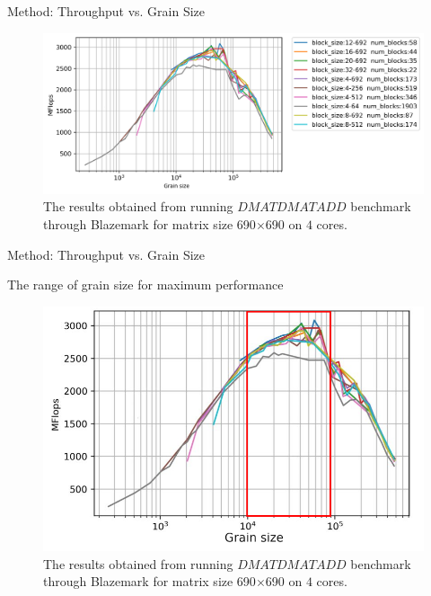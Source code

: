 \documentclass[10pt]{beamer}
\begin{document}
\begin{frame}{Method: Throughput vs. Grain Size}
	\begin{outline}
		\begin{figure}[H]
			\centering\includegraphics[width=1\linewidth]{images/fig6.png}
			\caption{The results obtained from running $DMATDMATADD$ benchmark through Blazemark for matrix size 690$\times$690 on $4$ cores.}	
			\label{fig6}
		\end{figure}
	
	\end{outline}
\end{frame}

\begin{frame}{Method: Throughput vs. Grain Size}
	\begin{outline}		
		The range of grain size for maximum performance
		\begin{figure}[H]
			\centering\includegraphics[scale=0.9]{images/fig6_range.png}
			\caption{The results obtained from running $DMATDMATADD$ benchmark through Blazemark for matrix size 690$\times$690 on $4$ cores.}	
			\label{fig7}
		\end{figure}
		
	\end{outline}
\end{frame}
\end{document}
